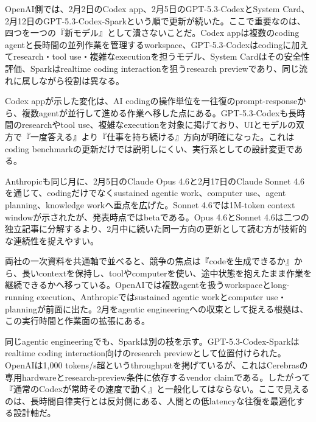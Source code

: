 OpenAI側では、2月2日のCodex app、2月5日のGPT-5.3-CodexとSystem Card、2月12日のGPT-5.3-Codex-Sparkという順で更新が続いた。ここで重要なのは、四つを一つの『新モデル』として潰さないことだ。Codex appは複数のcoding agentと長時間の並列作業を管理するworkspace、GPT-5.3-Codexはcodingに加えてresearch・tool use・複雑なexecutionを担うモデル、System Cardはその安全性評価、Sparkはrealtime coding interactionを狙うresearch previewであり、同じ流れに属しながら役割は異なる。\autocite{src-15823ae5556e,src-4a841ea7ec7c,src-9aba7995b6a5,src-dd64fe3084a4}


Codex appが示した変化は、AI codingの操作単位を一往復のprompt-responseから、複数agentが並行して進める作業へ移した点にある。GPT-5.3-Codexも長時間のresearchやtool use、複雑なexecutionを対象に掲げており、UIとモデルの双方で『一度答える』より『仕事を持ち続ける』方向が明確になった。これはcoding benchmarkの更新だけでは説明しにくい、実行系としての設計変更である。\autocite{src-15823ae5556e,src-9aba7995b6a5}


Anthropicも同じ月に、2月5日のClaude Opus 4.6と2月17日のClaude Sonnet 4.6を通じて、codingだけでなくsustained agentic work、computer use、agent planning、knowledge workへ重点を広げた。Sonnet 4.6では1M-token context windowが示されたが、発表時点ではbetaである。Opus 4.6とSonnet 4.6は二つの独立記事に分解するより、2月中に続いた同一方向の更新として読む方が技術的な連続性を捉えやすい。\autocite{src-f6aa679babd7}


両社の一次資料を共通軸で並べると、競争の焦点は『codeを生成できるか』から、長いcontextを保持し、toolやcomputerを使い、途中状態を抱えたまま作業を継続できるかへ移っている。OpenAIでは複数agentを扱うworkspaceとlong-running execution、Anthropicではsustained agentic workとcomputer use・planningが前面に出た。2月をagentic engineeringへの収束として捉える根拠は、この実行時間と作業面の拡張にある。\autocite{src-15823ae5556e,src-9aba7995b6a5,src-f6aa679babd7}


同じagentic engineeringでも、Sparkは別の枝を示す。GPT-5.3-Codex-Sparkはrealtime coding interaction向けのresearch previewとして位置付けられた。OpenAIは1,000 tokens/s超というthroughputを掲げているが、これはCerebrasの専用hardwareとresearch-preview条件に依存するvendor claimである。したがって『通常のCodexが常時その速度で動く』と一般化してはならない。ここで見えるのは、長時間自律実行とは反対側にある、人間との低latencyな往復を最適化する設計軸だ。\autocite{src-15823ae5556e,src-4a841ea7ec7c,src-9aba7995b6a5,src-dd64fe3084a4}


